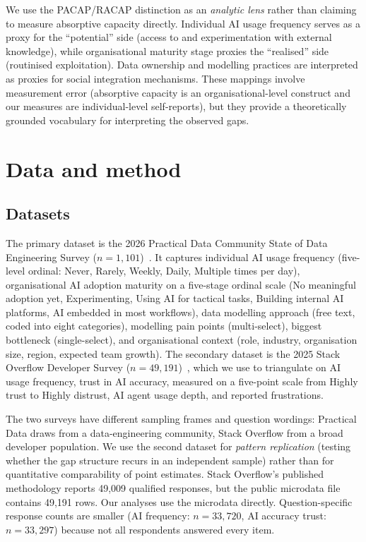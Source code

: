 \documentclass[twocolumn]{article}
\begin{document}
We use the PACAP/RACAP distinction as an \textit{analytic lens} rather than claiming to measure absorptive capacity directly. Individual AI usage frequency serves as a proxy for the ``potential'' side (access to and experimentation with external knowledge), while organisational maturity stage proxies the ``realised'' side (routinised exploitation). Data ownership and modelling practices are interpreted as proxies for social integration mechanisms. These mappings involve measurement error (absorptive capacity is an organisational-level construct and our measures are individual-level self-reports), but they provide a theoretically grounded vocabulary for interpreting the observed gaps.


\section{Data and method}

\subsection{Datasets}

The primary dataset is the 2026 Practical Data Community State of Data Engineering Survey ($n{=}1{,}101$)~\cite{practicaldata2026}. It captures individual AI usage frequency (five-level ordinal: Never, Rarely, Weekly, Daily, Multiple times per day), organisational AI adoption maturity on a five-stage ordinal scale (No meaningful adoption yet, Experimenting, Using AI for tactical tasks, Building internal AI platforms, AI embedded in most workflows), data modelling approach (free text, coded into eight categories), modelling pain points (multi-select), biggest bottleneck (single-select), and organisational context (role, industry, organisation size, region, expected team growth). The secondary dataset is the 2025 Stack Overflow Developer Survey ($n{=}49{,}191$)~\cite{stackoverflow2025}, which we use to triangulate on AI usage frequency, trust in AI accuracy, measured on a five-point scale from Highly trust to Highly distrust, AI agent usage depth, and reported frustrations.

The two surveys have different sampling frames and question wordings: Practical Data draws from a data-engineering community, Stack Overflow from a broad developer population. We use the second dataset for \textit{pattern replication} (testing whether the gap structure recurs in an independent sample) rather than for quantitative comparability of point estimates. Stack Overflow's published methodology reports 49,009 qualified responses, but the public microdata file contains 49,191 rows. Our analyses use the microdata directly. Question-specific response counts are smaller (AI frequency: $n{=}33{,}720$, AI accuracy trust: $n{=}33{,}297$) because not all respondents answered every item.
\end{document}
